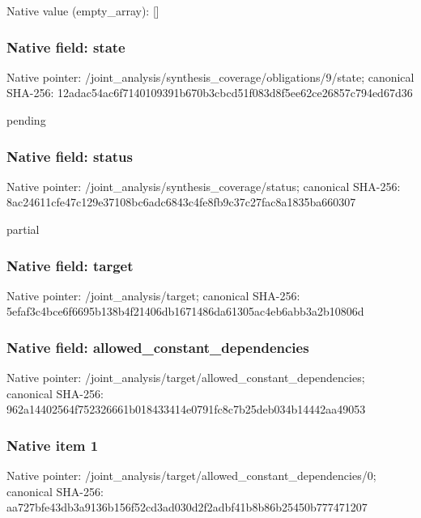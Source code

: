 \documentclass[10pt,a4paper]{article}
\begin{document}
Native value (empty\_\allowbreak{}array): []

\subsubsection{Native field: state}
Native pointer: /joint\_\allowbreak{}analysis/synthesis\_\allowbreak{}coverage/obligations/9/state; canonical SHA-256: 12adac54ac6f7140109391b670b3cbcd51f083d8f5ee62ce26857c794ed67d36

\begingroup\raggedright\sloppy pending\par\endgroup

\subsubsection{Native field: status}
Native pointer: /joint\_\allowbreak{}analysis/synthesis\_\allowbreak{}coverage/status; canonical SHA-256: 8ac24611cfe47c129e37108bc6adc6843c4fe8fb9c37c27fac8a1835ba660307

\begingroup\raggedright\sloppy partial\par\endgroup

\subsubsection{Native field: target}
Native pointer: /joint\_\allowbreak{}analysis/target; canonical SHA-256: 5efaf3c4bce6f6695b138b4f21406db1671486da61305ac4eb6abb3a2b10806d

\subsubsection{Native field: allowed\_\allowbreak{}constant\_\allowbreak{}dependencies}
Native pointer: /joint\_\allowbreak{}analysis/target/allowed\_\allowbreak{}constant\_\allowbreak{}dependencies; canonical SHA-256: 962a14402564f752326661b018433414e0791fc8c7b25deb034b14442aa49053

\subsubsection{Native item 1}
Native pointer: /joint\_\allowbreak{}analysis/target/allowed\_\allowbreak{}constant\_\allowbreak{}dependencies/0; canonical SHA-256: aa727bfe43db3a9136b156f52cd3ad030d2f2adbf41b8b86b25450b777471207
\end{document}
